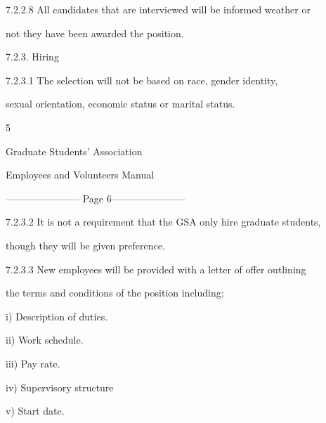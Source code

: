   



7.2.2.8 All  candidates  that  are  interviewed  will  be  informed  weather  or  

         not  they  have been awarded the position.  



                                                     



          7.2.3. Hiring  



7.2.3.1 The  selection  will  not  be  based  on  race,  gender  identity,   

          sexual  orientation, economic status or marital status.  



  



                                                        5  

  

                                  Graduate Students’ Association  

                               Employees and Volunteers Manual  


----------------------- Page 6-----------------------

7.2.3.2 It is not a requirement that the GSA only hire graduate students,  

        though they will be given preference.  



  



7.2.3.3 New  employees  will  be  provided  with  a  letter  of  offer  outlining  

        the  terms  and conditions of the position including:  



                   i)       Description of duties.   



                   ii)      Work schedule.  



                   iii)     Pay rate.  



                   iv)       Supervisory structure   



                  v)         Start date.  



